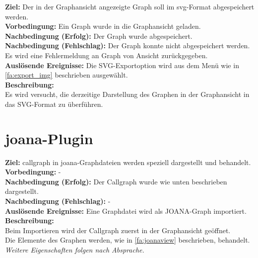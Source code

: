 \label{fa:export_svg}
\textbf{Ziel:} Der in der Graphansicht angezeigte Graph soll im \gls{svg}-Format abgespeichert werden.\\
\textbf{Vorbedingung:} Ein Graph wurde in die Graphansicht geladen.\\
\textbf{Nachbedingung (Erfolg):} Der Graph wurde abgespeichert.\\
\textbf{Nachbedingung (Fehlschlag):} Der Graph konnte nicht abgespeichert werden. Es wird eine Fehlermeldung an Graph von Ansicht zurückgegeben.\\
\textbf{Auslösende Ereignisse:} Die SVG-Exportoption wird aus dem Menü wie in \ref{fa:export_img} beschrieben ausgewählt.\\
\textbf{Beschreibung:}\\
Es wird versucht, die derzeitige Darstellung des Graphen in der Graphansicht in das SVG-Format zu überführen.

\section{\gls{joana}-Plugin}
\setcounter{fanr}{500}

\label{fa:callview}
\textbf{Ziel:} \gls{callgraph} in \gls{joana}-Graphdateien werden speziell dargestellt und behandelt.\\
\textbf{Vorbedingung:} -\\
\textbf{Nachbedingung (Erfolg):} Der Callgraph wurde wie unten beschrieben dargestellt.\\
\textbf{Nachbedingung (Fehlschlag):} -\\
\textbf{Auslösende Ereignisse:} Eine Graphdatei wird als JOANA-Graph importiert.\\
\textbf{Beschreibung:}\\
Beim Importieren wird der Callgraph zuerst in der Graphansicht geöffnet.\\
Die Elemente des Graphen werden, wie in \ref{fa:joanaview} beschrieben, behandelt.
\textit{Weitere Eigenschaften folgen nach Absprache.}

